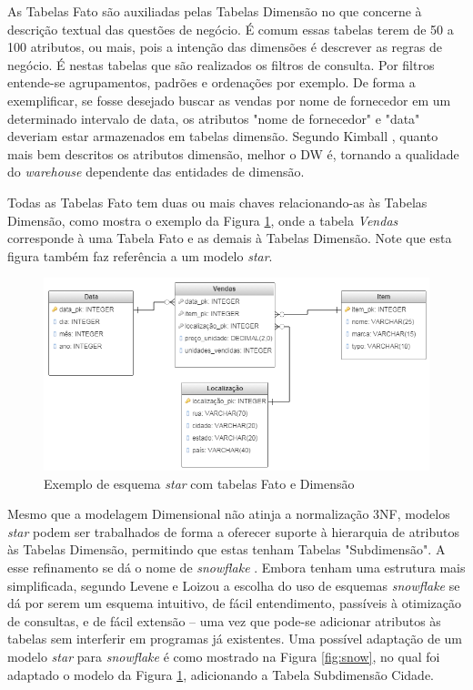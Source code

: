 As Tabelas Fato são auxiliadas pelas Tabelas Dimensão no que concerne à descrição textual das questões de negócio. É comum essas tabelas terem de 50 a 100 atributos, ou mais, pois a intenção das dimensões é descrever as regras de negócio. É nestas tabelas que são realizados os filtros de consulta. Por filtros entende-se agrupamentos, padrões e ordenações por exemplo. De forma a exemplificar, se fosse desejado buscar as vendas por nome de fornecedor em um determinado intervalo de data, os atributos "nome de fornecedor" e "data" deveriam estar armazenados em tabelas dimensão. Segundo Kimball \cite{kimball2002dw}, quanto mais bem descritos os atributos dimensão, melhor o DW é, tornando a qualidade do \textit{warehouse} dependente das entidades de dimensão.

Todas as Tabelas Fato tem duas ou mais chaves relacionando-as às Tabelas Dimensão, como mostra o exemplo da Figura \ref{fig:star_dim}, onde a tabela \textit{Vendas} corresponde à uma Tabela Fato e as demais à Tabelas Dimensão. Note que esta figura também faz referência a um modelo \textit{star}.

\begin{figure}[htpb]
	\centering
		\includegraphics[width=13cm]{img/star_dim}
	\caption{Exemplo de esquema \textit{star} com tabelas Fato e Dimensão}
	\label{fig:star_dim}
\end{figure}

Mesmo que a modelagem Dimensional não atinja a normalização 3NF, modelos \textit{star} podem ser trabalhados de forma a oferecer suporte à hierarquia de atributos às Tabelas Dimensão, permitindo que estas tenham Tabelas "Subdimensão". A esse refinamento se dá o nome de \textit{snowflake} \cite{navathe2011banco}. Embora tenham uma estrutura mais simplificada, segundo Levene e Loizou \cite{levene2003snowflake} a escolha do uso de esquemas \textit{snowflake} se dá por serem um esquema intuitivo, de fácil entendimento, passíveis à otimização de consultas, e de fácil extensão -- uma vez que pode-se adicionar atributos às tabelas sem interferir em programas já existentes. Uma possível adaptação de um modelo \textit{star} para \textit{snowflake} é como mostrado na Figura \ref{fig:snow}, no qual foi adaptado o modelo da Figura \ref{fig:star_dim}, adicionando a Tabela Subdimensão Cidade. 

